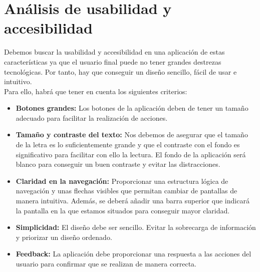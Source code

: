\chapter{Análisis de usabilidad y accesibilidad}
\label{chap:Accessibility}

Debemos buscar la usabilidad y accesibilidad en una aplicación de estas características ya que el usuario final puede no tener grandes destrezas tecnológicas. Por tanto, hay que conseguir un diseño sencillo, fácil de usar e intuitivo. \\

Para ello, habrá que tener en cuenta los siguientes criterios:

\begin{itemize}
	\item \textbf{Botones grandes:} Los botones de la aplicación deben de tener un tamaño adecuado para facilitar la realización de acciones. 
	\item \textbf{Tamaño y contraste del texto:} Nos debemos de asegurar que el tamaño de la letra es lo suficientemente grande y que el contraste con el fondo es significativo para facilitar con ello la lectura. El fondo de la aplicación será blanco para conseguir un buen contraste y evitar las distracciones. 
	\item \textbf{Claridad en la navegación:} Proporcionar una estructura lógica de navegación y unas flechas visibles que permitan cambiar de pantallas de manera intuitiva. Además, se deberá añadir una barra superior que indicará la pantalla en la que estamos situados para conseguir mayor claridad. 
	\item \textbf{Simplicidad:} El diseño debe ser sencillo. Evitar la sobrecarga de información y priorizar un diseño ordenado. 
	\item \textbf{Feedback:} La aplicación debe proporcionar una respuesta a las acciones del usuario para confirmar que se realizan de manera correcta. 
\end{itemize} 
